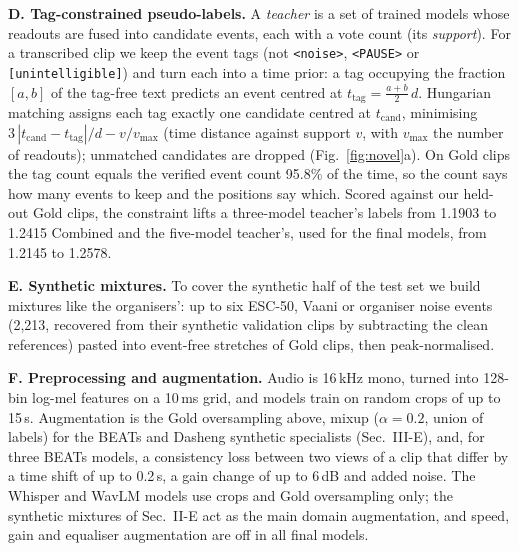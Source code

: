 \documentclass[conference]{IEEEtran}
\begin{document}
\textbf{D. Tag-constrained pseudo-labels.}
A \emph{teacher} is a set of trained models whose readouts are fused into candidate events, each with a vote count (its \emph{support}).
For a transcribed clip we keep the event tags (not \texttt{<noise>}, \texttt{<PAUSE>} or \texttt{[unintelligible]}) and turn each into a time prior: a tag occupying the fraction $[a,b]$ of the tag-free text predicts an event centred at $t_{\text{tag}}=\frac{a+b}{2}\,d$.
Hungarian matching assigns each tag exactly one candidate centred at $t_{\text{cand}}$, minimising $3\,|t_{\text{cand}}-t_{\text{tag}}|/d - v/v_{\max}$ (time distance against support $v$, with $v_{\max}$ the number of readouts); unmatched candidates are dropped (Fig.~\ref{fig:novel}a).
On Gold clips the tag count equals the verified event count 95.8\% of the time, so the count says how many events to keep and the positions say which.
Scored against our held-out Gold clips, the constraint lifts a three-model teacher's labels from 1.1903 to 1.2415 Combined and the five-model teacher's, used for the final models, from 1.2145 to 1.2578.

\textbf{E. Synthetic mixtures.}
To cover the synthetic half of the test set we build mixtures like the organisers': up to six ESC-50, Vaani or organiser noise events (2,213, recovered from their synthetic validation clips by subtracting the clean references) pasted into event-free stretches of Gold clips, then peak-normalised.

\textbf{F. Preprocessing and augmentation.}
Audio is 16\,kHz mono, turned into 128-bin log-mel features on a 10\,ms grid, and models train on random crops of up to 15\,s.
Augmentation is the Gold oversampling above, mixup ($\alpha=0.2$, union of labels) for the BEATs and Dasheng synthetic specialists (Sec.~III-E), and, for three BEATs models, a consistency loss between two views of a clip that differ by a time shift of up to 0.2\,s, a gain change of up to 6\,dB and added noise.
The Whisper and WavLM models use crops and Gold oversampling only; the synthetic mixtures of Sec.~II-E act as the main domain augmentation, and speed, gain and equaliser augmentation are off in all final models.
\end{document}
